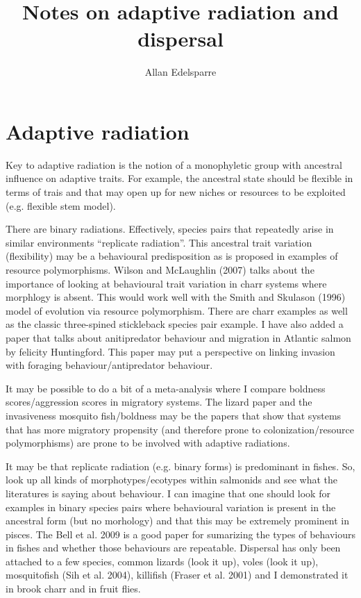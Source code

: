 \documentclass[11pt]{article}
\title{\textbf{Notes on adaptive radiation and dispersal}}
\author{Allan Edelsparre}
\date{}
\begin{document}
\maketitle

\section{Adaptive radiation}

Key to adaptive radiation is the notion of a monophyletic group with ancestral influence on adaptive traits. For example, the ancestral state should be flexible in terms of trais and that may open up for new niches or resources to be exploited (e.g. flexible stem model).

There are binary radiations. Effectively, species pairs that repeatedly arise in similar environments ``replicate radiation''. This ancestral trait variation (flexibility) may be a behavioural predisposition as is proposed in examples of resource polymorphisms. Wilson and McLaughlin (2007) talks about the importance of looking at behavioural trait variation in charr systems where morphlogy is absent. This would work well with the Smith and Skulason (1996) model of evolution via resource polymorphism. There are charr examples as well as the classic three-spined stickleback species pair example. I have also added a paper that talks about anitipredator behaviour and migration in Atlantic salmon by felicity Huntingford. This paper may put a perspective on linking invasion with foraging behaviour/antipredator behaviour. 

It may be possible to do a bit of a meta-analysis where I compare boldness scores/aggression scores in migratory systems. The lizard paper and the invasiveness mosquito fish/boldness may be the papers that show that systems that has more migratory propensity (and therefore prone to colonization/resource polymorphisms) are prone to be involved with adaptive radiations.

It may be that replicate radiation (e.g. binary forms) is predominant in fishes. So, look up all kinds of morphotypes/ecotypes within salmonids and see what the literatures is saying about behaviour. I can imagine that one should look for examples in binary species pairs where behavioural variation is present in the ancestral form (but no morhology) and that this may be extremely prominent in pisces. The Bell et al. 2009 is a good paper for sumarizing the types of behaviours in fishes and whether those behaviours are repeatable. Dispersal has only been attached to a few species, common lizards (look it up), voles (look it up), mosquitofish (Sih et al. 2004), killifish (Fraser et al. 2001) and I demonstrated it in brook charr and in fruit flies.
\end{document}
